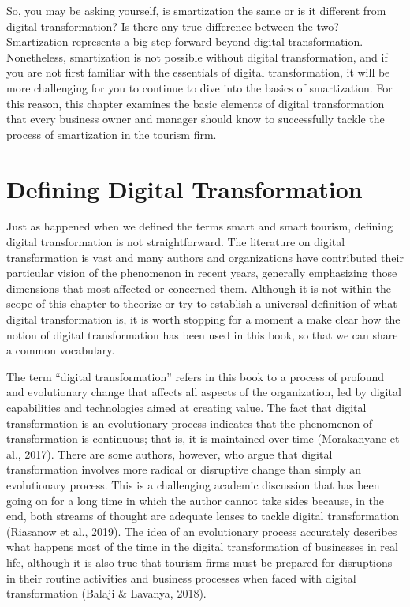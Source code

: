 \documentclass[
  letterpaper,
  DIV=11,
  numbers=noendperiod]{scrreprt}
\begin{document}
So, you may be asking yourself, is smartization the same or is it
different from digital transformation? Is there any true difference
between the two? Smartization represents a big step forward beyond
digital transformation. Nonetheless, smartization is not possible
without digital transformation, and if you are not first familiar with
the essentials of digital transformation, it will be more challenging
for you to continue to dive into the basics of smartization. For this
reason, this chapter examines the basic elements of digital
transformation that every business owner and manager should know to
successfully tackle the process of smartization in the tourism firm.

\hypertarget{defining-digital-transformation}{%
\section{Defining Digital
Transformation}\label{defining-digital-transformation}}

Just as happened when we defined the terms smart and smart tourism,
defining digital transformation is not straightforward. The literature
on digital transformation is vast and many authors and organizations
have contributed their particular vision of the phenomenon in recent
years, generally emphasizing those dimensions that most affected or
concerned them. Although it is not within the scope of this chapter to
theorize or try to establish a universal definition of what digital
transformation is, it is worth stopping for a moment a make clear how
the notion of digital transformation has been used in this book, so that
we can share a common vocabulary.

The term ``digital transformation'' refers in this book to a process of
profound and evolutionary change that affects all aspects of the
organization, led by digital capabilities and technologies aimed at
creating value. The fact that digital transformation is an evolutionary
process indicates that the phenomenon of transformation is continuous;
that is, it is maintained over time (Morakanyane et al., 2017). There
are some authors, however, who argue that digital transformation
involves more radical or disruptive change than simply an evolutionary
process. This is a challenging academic discussion that has been going
on for a long time in which the author cannot take sides because, in the
end, both streams of thought are adequate lenses to tackle digital
transformation (Riasanow et al., 2019). The idea of an evolutionary
process accurately describes what happens most of the time in the
digital transformation of businesses in real life, although it is also
true that tourism firms must be prepared for disruptions in their
routine activities and business processes when faced with digital
transformation (Balaji \& Lavanya, 2018).
\end{document}
